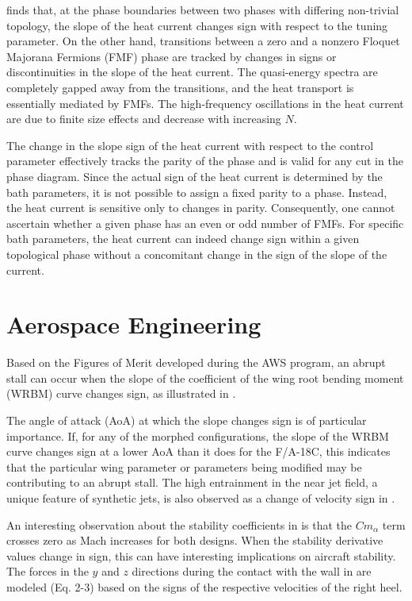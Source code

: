 \documentclass[11pt]{book}
\begin{document}
\cite{molignini2017sensing} finds that, at the phase boundaries between two phases with differing non-trivial topology, the slope of the heat current changes sign with respect to the tuning parameter. On the other hand, transitions between a zero and a nonzero Floquet Majorana Fermions (FMF) phase are tracked by changes in signs or discontinuities in the slope of the heat current. The quasi-energy spectra are completely gapped away from the transitions, and the heat transport is essentially mediated by FMFs. The high-frequency oscillations in the heat current are due to finite size effects and decrease with increasing $N$. 

The change in the slope sign of the heat current with respect to the control parameter effectively tracks the parity of the phase and is valid for any cut in the phase diagram. Since the actual sign of the heat current is determined by the bath parameters, it is not possible to assign a fixed parity to a phase. Instead, the heat current is sensitive only to changes in parity. Consequently, one cannot ascertain whether a given phase has an even or odd number of FMFs. For specific bath parameters, the heat current can indeed change sign within a given topological phase without a concomitant change in the sign of the slope of the current.


\section{Aerospace Engineering}
Based on the Figures of Merit developed during the AWS program, an abrupt stall can occur when the slope of the coefficient of the wing root bending moment (WRBM) curve changes sign, as illustrated in \cite{green2005f}. 

The angle of attack (AoA) at which the slope changes sign is of particular importance. If, for any of the morphed configurations, the slope of the WRBM curve changes sign at a lower AoA than it does for the F/A-18C, this indicates that the particular wing parameter or parameters being modified may be contributing to an abrupt stall. The high entrainment in the near jet field, a unique feature of synthetic jets, is also observed as a change of velocity sign in \cite{hashiehbaf2014experimental}.

An interesting observation about the stability coefficients in \cite{allen2017aerodynamic} is that the $Cm_{\alpha}$ term crosses zero as Mach increases for both designs. When the stability derivative values change in sign, this can have interesting implications on aircraft stability. The forces in the $y$ and $z$ directions during the contact with the wall in \cite{zhang2019effects} are modeled (Eq. 2-3) based on the signs of the respective velocities of the right heel.
\end{document}
